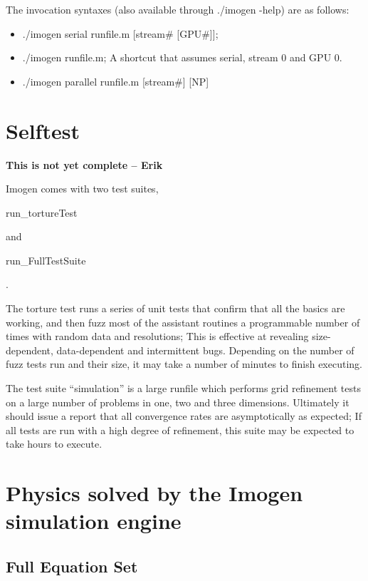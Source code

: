 \documentclass[letterpaper,12pt]{article}
\begin{document}
The invocation syntaxes (also available through ./imogen -help) are as follows:
\begin{itemize}
\item ./imogen serial runfile.m [stream\# [GPU\#]];
\item ./imogen runfile.m; A shortcut that assumes serial, stream 0 and GPU 0.
\item ./imogen parallel runfile.m [stream\#] [NP]
\end{itemize}

\section{Selftest}

\textbf{This is not yet complete -- Erik}

Imogen comes with two test suites, \begin{tt}run\_tortureTest\end{tt} and \begin{tt}run\_FullTestSuite\end{tt}.

The torture test runs a series of unit tests that confirm that all the basics are working, and
then fuzz most of the assistant routines a programmable number of times with random data and
resolutions; This is effective at revealing size-dependent, data-dependent and intermittent bugs.
Depending on the number of fuzz tests run and their size, it may take a number of minutes
to finish executing.

The test suite ``simulation'' is a large runfile which performs grid refinement tests on a large
number of problems in one, two and three dimensions. Ultimately it should issue a report
that all convergence rates are asymptotically as expected; If all tests are run with a high
degree of refinement, this suite may be expected to take hours to execute.

\section{Physics solved by the Imogen simulation engine}

\subsection{Full Equation Set}
\end{document}
